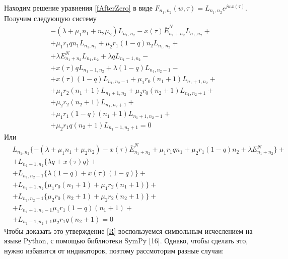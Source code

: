 Находим решение уравнения \eqref{fAfterZero} в виде $F_{n_{1}, n_{2}}(w,\tau)=L_{n_{1}, n_{2}}e^{jwx(\tau)}$. Получим следующую систему\\
\begin{equation}
	\begin{split}
		&-(\lambda+\mu_{1}n_{1}+n_{2}\mu_{2})L_{n_{1}, n_{2}} 
		- x(\tau)\overline{E}_{n_{1}+n_{2}}^N L_{n_{1}, n_{2}}+\\
		&+ \mu_{1}r_{1}qn_{1}L_{n_{1}, n_{2}}+ \mu_{2}r_{1}(1-q)n_{2}L_{n_{1}, n_{2}}+\\
		&+ \lambda  E_{n_{1}+n_{2}}^N L_{n_{1}, n_{2}}+\lambda qL_{n_{1}-1, n_{2}}-\\
		&+ x(\tau) q  L_{n_{1}-1, n_{2}}+\lambda (1-q)L_{n_{1}, n_{2}-1} -\\
		&+ x(\tau) (1-q) L_{n_{1}, n_{2}-1}+ \mu_{1} r_{0} (n_{1}+1)L_{n_{1} +1 , n_{2}} +\\
		&+ \mu_{1} r_{2} (n_{1}+1) L_{n_{1} + 1, n_{2}}+ \mu_{2} r_{0} (n_{2}+1)L_{n_{1}, n_{2} + 1 }+\\
		& + \mu_{2} r_{2} (n_{2}+1) L_{n_{1}, n_{2} + 1}+\\
		&+\mu_{1} r_{1}(1-q)(n_{1}+1) L_{n_{1} +1 , n_{2}-1}+\\
		&+\mu_{2} r_{1}q (n_{2}+1)L_{n_{1} -1 , n_{2}+1}=0
	\end{split}
\end{equation}
Или
\begin{equation}
	\begin{split}
		&L_{n_{1}, n_{2}}\{-(\lambda+\mu_{1}n_{1}+\mu_{2}n_{2}) - x(\tau)\overline{E}_{n_{1}+n_{2}}^N+ \mu_{1}r_{1}qn_{1}+ \mu_{2}r_{1}(1-q)n_{2}+ \lambda  E_{n_{1}+n_{2}}^N\}+\\
		&+L_{n_{1}-1, n_{2}}\{\lambda q+ x(\tau) q  \}+\\
		&+L_{n_{1}, n_{2}-1}\{\lambda (1-q) + x(\tau) (1-q) \}+\\
		&+L_{n_{1} +1 , n_{2}}\{ \mu_{1} r_{0}(n_{1}+1) + \mu_{1} r_{2} (n_{1}+1)\}+\\
		&+L_{n_{1}, n_{2} + 1 }\{ \mu_{2} r_{0} (n_{2}+1) + \mu_{2} r_{2} (n_{2}+1) \}+\\
		&+ L_{n_{1} +1 , n_{2}-1}\mu_{1} r_{1}(1-q)(n_{1}+1)+\\
		&+L_{n_{1} -1 , n_{2}+1}\mu_{2} r_{1}q(n_{2}+1) =0
	\end{split}
\end{equation}
Чтобы доказать это утверждение \eqref{R} воспользуемся символьным исчеслением на языке Python, с помощью библиотеки SymPy [16]. Однако, чтобы сделать это, нужно избавится от индикаторов, поэтому рассмоторим разные случаи:\\

